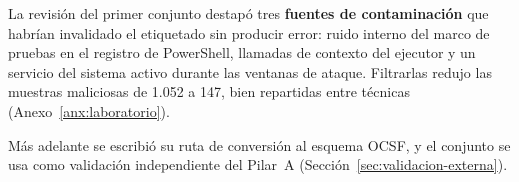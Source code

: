 La revisión del primer conjunto destapó tres \textbf{fuentes de contaminación} que habrían
invalidado el etiquetado sin producir error: ruido interno del marco de pruebas en el registro de
PowerShell, llamadas de contexto del ejecutor y un servicio del sistema activo durante las
ventanas de ataque. Filtrarlas redujo las muestras maliciosas de 1.052 a 147, bien repartidas
entre técnicas (Anexo~\ref{anx:laboratorio}).

Más adelante se escribió su ruta de conversión al esquema OCSF, y el conjunto se usa como validación
independiente del Pilar~A (Sección~\ref{sec:validacion-externa}).








